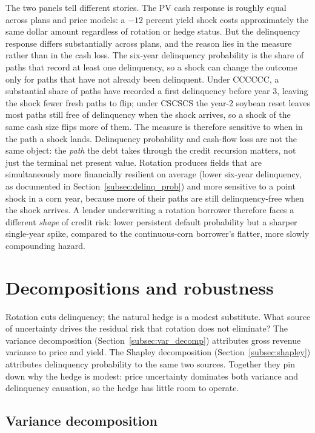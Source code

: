 \documentclass[11pt,letterpaper]{article}
\theoremstyle{remark}
\begin{document}
The two panels tell different stories. The PV cash response is roughly equal across plans and price models: a $-12$ percent yield shock costs approximately the same dollar amount regardless of rotation or hedge status. But the delinquency response differs substantially across plans, and the reason lies in the measure rather than in the cash loss. The six-year delinquency probability is the share of paths that record at least one delinquency, so a shock can change the outcome only for paths that have not already been delinquent. Under CCCCCC, a substantial share of paths have recorded a first delinquency before year 3, leaving the shock fewer fresh paths to flip; under CSCSCS the year-2 soybean reset leaves most paths still free of delinquency when the shock arrives, so a shock of the same cash size flips more of them. The measure is therefore sensitive to when in the path a shock lands. Delinquency probability and cash-flow loss are not the same object: the \textit{path} the debt takes through the credit recursion matters, not just the terminal net present value. Rotation produces fields that are simultaneously more financially resilient on average (lower six-year delinquency, as documented in Section~\ref{subsec:delinq_prob}) and more sensitive to a point shock in a corn year, because more of their paths are still delinquency-free when the shock arrives. A lender underwriting a rotation borrower therefore faces a different \textit{shape} of credit risk: lower persistent default probability but a sharper single-year spike, compared to the continuous-corn borrower's flatter, more slowly compounding hazard.
 
\section{\label{sec:robustness}Decompositions and robustness}
 
Rotation cuts delinquency; the natural hedge is a modest substitute. What source of uncertainty drives the residual risk that rotation does not eliminate? The variance decomposition (Section~\ref{subsec:var_decomp}) attributes gross revenue variance to price and yield. The Shapley decomposition (Section~\ref{subsec:shapley}) attributes delinquency probability to the same two sources. Together they pin down why the hedge is modest: price uncertainty dominates both variance and delinquency causation, so the hedge has little room to operate.
 
\subsection{\label{subsec:var_decomp}Variance decomposition}
 
\end{document}
